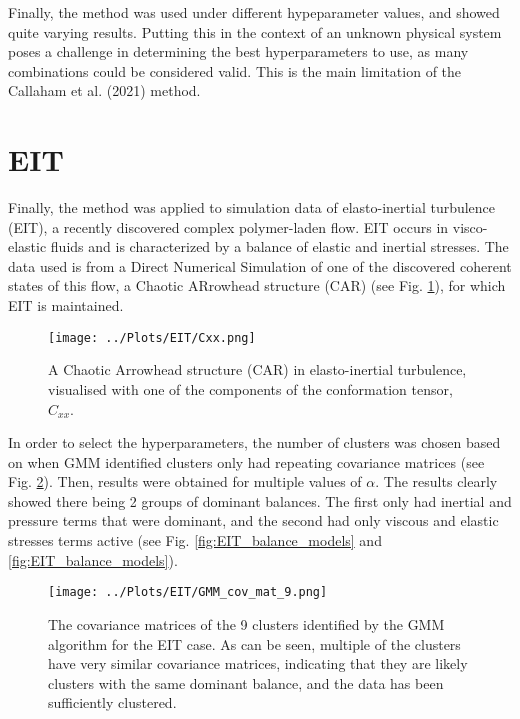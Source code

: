\documentclass[12pt]{report} %
\begin{document}
Finally, the method was used under different hypeparameter values, and showed quite varying results. Putting this in the context of an unknown physical system poses a challenge in determining the best hyperparameters to use, as many combinations could be considered valid. This is the main limitation of the Callaham et al. (2021) method.


\section{EIT}

Finally, the method was applied to simulation data of elasto-inertial turbulence (EIT), a recently discovered complex polymer-laden flow\cite{Samanta2012eit}. EIT occurs in visco-elastic fluids and is characterized by a balance of elastic and inertial stresses. The data used is from a Direct Numerical Simulation of one of the discovered coherent states of this flow\cite{beneitez2024multistability}, a Chaotic ARrowhead structure (CAR) (see Fig. \ref{fig:CAR}), for which EIT is maintained.

\begin{figure}[h]
  \centering
  \texttt{[image: ../Plots/EIT/Cxx.png]}
  \caption{A Chaotic Arrowhead structure (CAR) in elasto-inertial turbulence, visualised with one of the components of the conformation tensor, $C_{xx}$.}
  \label{fig:CAR}
\end{figure}

In order to select the hyperparameters, the number of clusters was chosen based on when GMM identified clusters only had repeating covariance matrices (see Fig. \ref{fig:Cov_Mat_EIT}). Then, results were obtained for multiple values of $\alpha$. The results clearly showed there being 2 groups of dominant balances. The first only had inertial and pressure terms that were dominant, and the second had only viscous and elastic stresses terms active (see Fig. \ref{fig:EIT_balance_models} and \ref{fig:EIT_balance_models}).

\begin{figure}[h]
  \centering
  \texttt{[image: ../Plots/EIT/GMM\_cov\_mat\_9.png]}
  \caption{The covariance matrices of the 9 clusters identified by the GMM algorithm for the EIT case. As can be seen, multiple of the clusters have very similar covariance matrices, indicating that they are likely clusters with the same dominant balance, and the data has been sufficiently clustered.}
  \label{fig:Cov_Mat_EIT}
\end{figure}
\end{document}
